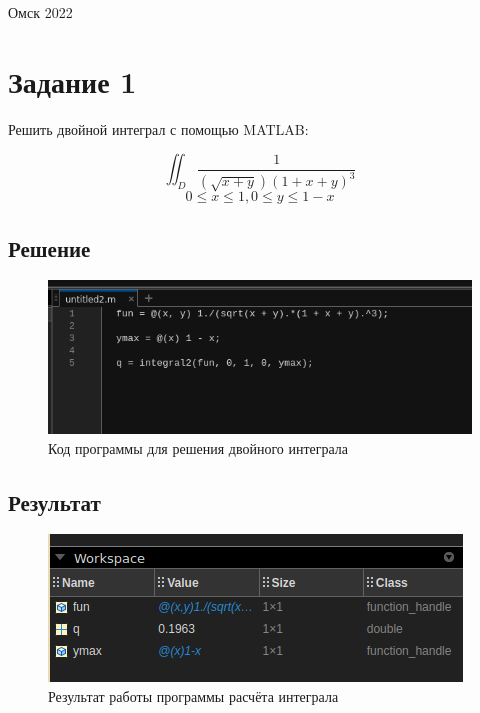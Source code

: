 \documentclass[14pt, a4paper]{article}
\begin{document}
    \vspace*{\fill}
    \begin{center}
        Омск 2022
    \end{center}

    \newpage

    \section*{Задание 1}

    Решить двойной интеграл с помощью MATLAB:

    \[ \iint_D{\frac{1}{(\sqrt{x + y}){(1 + x + y)}^3}} \]
    \[ 0 \leq x \leq 1, 0 \leq y \leq 1 - x \]

    \subsection*{Решение}

    \begin{figure}[H]
        \centering
        \includegraphics[width=\textwidth]{images/solution_integral.png}
        \caption{Код программы для решения двойного интеграла}
    \end{figure}

    \subsection*{Результат}

    \begin{figure}[H]
        \centering
        \includegraphics[width=\textwidth]{images/result_integral.png}
        \caption{Результат работы программы расчёта интеграла}
    \end{figure}
\end{document}

